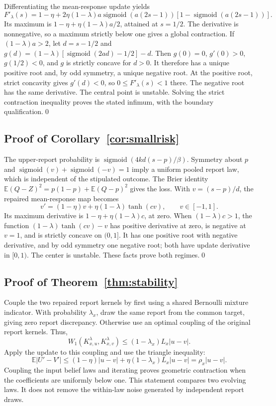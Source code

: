 \documentclass[10pt]{article}
\newcommand{\E}{\mathbb E}
\newcommand{\sig}{\operatorname{sigmoid}}
\begin{document}
Differentiating the mean-response update yields
\begin{equation}
 F'_\lambda(s)=1-\eta+
 2\eta(1-\lambda)a\sig(a(2s-1))[1-\sig(a(2s-1))].
\end{equation}
Its maximum is $1-\eta+\eta(1-\lambda)a/2$, attained at $s=1/2$.
The derivative is nonnegative, so a maximum strictly below one gives a
global contraction. If $(1-\lambda)a>2$, let
$d=s-1/2$ and
$g(d)=(1-\lambda)[\sig(2ad)-1/2]-d$.
Then $g(0)=0$, $g'(0)>0$, $g(1/2)<0$, and $g$ is strictly concave for
$d>0$. It therefore has a unique positive root and, by odd symmetry, a
unique negative root. At the positive root, strict concavity gives
$g'(d)<0$, so $0\le F'_\lambda(s)<1$ there. The negative root has the
same derivative. The central point is unstable. Solving the strict
contraction inequality proves the stated infimum, with the boundary
qualification.\qed


\subsection{Proof of Corollary~\ref{cor:smallrisk}}
The upper-report probability is $\sig(4kd(s-p)/\beta)$.
Symmetry about $p$ and $\sig(v)+\sig(-v)=1$ imply a uniform
pooled report law, which is independent of the stipulated outcome.
The Brier identity $\E(Q-Z)^2=p(1-p)+\E(Q-p)^2$ gives the loss.
With $v=(s-p)/d$, the repaired mean-response map becomes
\[
 v'=(1-\eta)v+\eta(1-\lambda)\tanh(cv),\qquad v\in[-1,1].
\]
Its maximum derivative is $1-\eta+\eta(1-\lambda)c$, at zero.
When $(1-\lambda)c>1$, the function
$(1-\lambda)\tanh(cv)-v$ has positive derivative at zero,
is negative at $v=1$, and is strictly concave on $(0,1]$.
It has one positive root with negative derivative, and by odd symmetry
one negative root; both have update derivative in $[0,1)$.
The center is unstable. These facts prove both regimes.\qed

\subsection{Proof of Theorem~\ref{thm:stability}}
Couple the two repaired report kernels by first using a shared Bernoulli
mixture indicator. With probability $\lambda_x$, draw the same report
from the common target, giving zero report discrepancy. Otherwise use an
optimal coupling of the original report kernels. Thus,
\begin{equation}
 W_1(K^\lambda_{x,u},K^\lambda_{x,v})
 \le(1-\lambda_x)L_x|u-v|.
\end{equation}
Apply the update to this coupling and use the triangle inequality:
\begin{equation}
 \E|U'-V'|\le(1-\eta)|u-v|+
  \eta(1-\lambda_x)L_x|u-v|=\rho_x|u-v|.
\end{equation}
Coupling the input belief laws and iterating proves geometric contraction
when the coefficients are uniformly below one. This statement compares
two evolving laws. It does not remove the within-law noise generated by
independent report draws.
\end{document}
